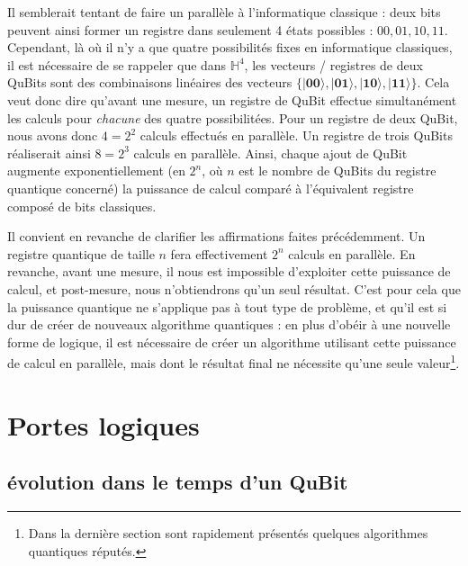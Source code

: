 \documentclass[a4paper,12pt]{report}
\newcommand{\quSt}[1]{\bm{|#1\rangle}}
\begin{document}
\vspace{1\baselineskip}

\par{
	Il semblerait tentant de faire un parallèle à l'informatique classique : deux bits peuvent ainsi former un registre dans seulement 4 états possibles : ${ 00, 01, 10, 11 }$. Cependant, là où il n'y a que quatre possibilités fixes en informatique classiques, il est nécessaire de se rappeler que dans $\mathbb{H}^4$, les vecteurs / registres de deux QuBits sont des combinaisons linéaires des vecteurs $ \{ \quSt{00}, \quSt{01}, \quSt{10}, \quSt{11} \} $. Cela veut donc dire qu'avant une mesure, un registre de QuBit effectue simultanément les calculs pour \emph{chacune} des quatre possibilitées. Pour un registre de deux QuBit, nous avons donc $4 = 2^2$ calculs effectués en parallèle. Un registre de trois QuBits réaliserait ainsi $8 = 2^3$ calculs en parallèle. Ainsi, chaque ajout de QuBit augmente exponentiellement (en $2^n$, où $n$ est le nombre de QuBits du registre quantique concerné) la puissance de calcul comparé à l'équivalent registre composé de bits classiques.
}

\vspace{1\baselineskip}

\par{
	Il convient en revanche de clarifier les affirmations faites précédemment. Un registre quantique de taille $n$ fera effectivement $2^n$ calculs en parallèle. En revanche, avant une mesure, il nous est impossible d'exploiter cette puissance de calcul, et post-mesure, nous n'obtiendrons qu'un seul résultat. C'est pour cela que la puissance quantique ne s'applique pas à tout type de problème, et qu'il est si dur de créer de nouveaux algorithme quantiques : en plus d'obéir à une nouvelle forme de logique, il est nécessaire de créer un algorithme utilisant cette puissance de calcul en parallèle, mais dont le résultat final ne nécessite qu'une seule valeur\footnote{Dans la dernière section sont rapidement présentés quelques algorithmes quantiques réputés. }.
}

	\section{Portes logiques}

		\subsection{évolution dans le temps d'un QuBit}
\end{document}
